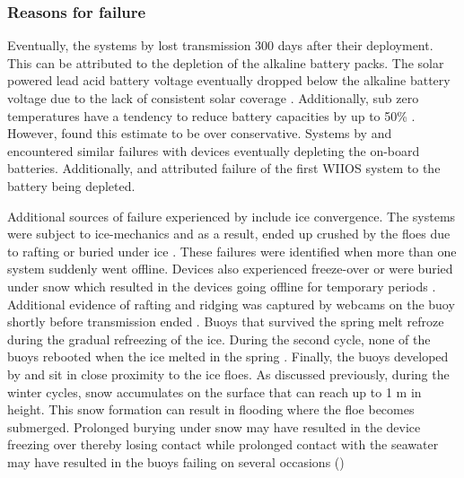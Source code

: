 \subsubsection{Reasons for failure}
\label{ch2:sec3_failiure}

Eventually, the systems by \textcite{doble2017robust} lost transmission 300 days after their deployment. This can be attributed to the depletion of the alkaline battery packs. The solar powered lead acid battery voltage eventually dropped below the alkaline battery voltage due to the lack of consistent solar coverage \cite{doble2017robust}. Additionally, sub zero temperatures have a tendency to reduce battery capacities by up to 50\% \cite{doble2017robust}. However, \textcite{doble2017robust} found this estimate to be over conservative. Systems by \textcite{kohout2015device} and \textcite{doble2017robust} encountered similar failures with devices eventually depleting the on-board batteries. Additionally, \textcite{vichi2019effects} and \textcite{alberello2019drift} attributed failure of the first WIIOS system to the battery being depleted.\par 

Additional sources of failure experienced by \textcite{doble2017robust} include ice convergence. The systems were subject to ice-mechanics and as a result, ended up crushed by the floes due to rafting or buried under ice \textcite{doble2017robust}. These failures were identified when more than one system suddenly went offline. Devices also experienced freeze-over or were buried under snow which resulted in the devices going offline for temporary periods \cite{doble2017robust}. Additional evidence of rafting and ridging was captured by webcams on the buoy shortly before transmission ended \cite{doble2017robust}. Buoys that survived the spring melt refroze during the gradual refreezing of the ice. During the second cycle, none of the buoys rebooted when the ice melted in the spring \cite{doble2017robust}. Finally, the buoys developed by \textcite{kohout2015device} and \textcite{rabault2017measurements} sit in close proximity to the ice floes. As discussed previously, during the winter cycles, snow accumulates on the surface that can reach up to 1 m in height. This snow formation can result in flooding where the floe becomes submerged. Prolonged burying under snow may have resulted in the device freezing over thereby losing contact while prolonged contact with the seawater may have resulted in the buoys failing on several occasions (\cite{kohout2015device,vichi2019effects,albarello2020drift,rabault2019open})\par 

